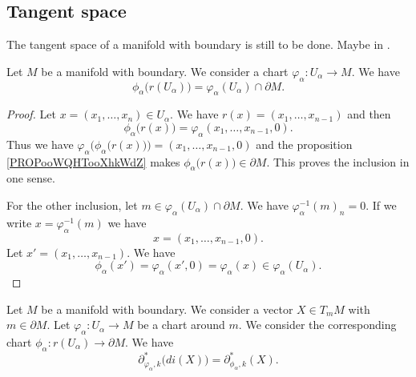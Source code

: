 \subsection{Tangent space}

The tangent space of a manifold with boundary is still to be done. Maybe in \cite{BIBooQPQXooULIQko}.


\begin{corollary}	\label{CORooYCMSooLmSJVN}
	Let \( M\) be a manifold with boundary. We consider a chart \(\varphi_{\alpha} \colon  U_{\alpha}\to M  \). We have
	\begin{equation}
		\phi_{\alpha}\big( r(U_{\alpha}) \big)=\varphi_{\alpha}(U_{\alpha})\cap \partial M.
	\end{equation}
\end{corollary}

\begin{proof}
	Let \( x=(x_1,\ldots,x_n)\in U_{\alpha}\). We have \( r(x)=(x_1,\ldots,x_{n-1})\) and then
	\begin{equation}
		\phi_{\alpha}\big( r(x) \big)=\varphi_{\alpha}(x_1,\ldots,x_{n-1}, 0).
	\end{equation}
	Thus we have \( \varphi_{\alpha}\Big( \phi_{\alpha}\big( r(x) \big) \Big)=(x_1,\ldots,x_{n-1},0)\) and the proposition \ref{PROPooWQHTooXhkWdZ} makes \( \phi_{\alpha}\big( r(x) \big)\in \partial M\). This proves the inclusion in one sense.

	For the other inclusion, let \( m\in \varphi_{\alpha}(U_{\alpha})\cap \partial M\). We have \( \varphi_{\alpha}^{-1}(m)_n=0\). If we write \( x=\varphi_{\alpha}^{-1}(m)\) we have
	\begin{equation}
		x=(x_1,\ldots,x_{n-1}, 0).
	\end{equation}
	Let \( x'=(x_1,\ldots,x_{n-1})\). We have
	\begin{equation}
		\phi_{\alpha}(x')=\varphi_{\alpha}(x',0)=\varphi_{\alpha}(x)\in \varphi_{\alpha}(U_{\alpha}).
	\end{equation}
\end{proof}

\begin{proposition}	\label{PROPooKBKAooKjORhq}
	Let \( M\) be a manifold with boundary. We consider a vector \( X\in T_mM\) with \( m\in \partial M\). Let \(\varphi_{\alpha} \colon U_{\alpha}\to M  \) be a chart around \( m\). We consider the corresponding chart \(\phi_{\alpha} \colon r(U_{\alpha})\to \partial M  \). We have
	\begin{equation}
		\partial_{\varphi_{\alpha},k}^*\big( di(X) \big)=\partial_{\phi_{\alpha},k}^*(X).
	\end{equation}
\end{proposition}

